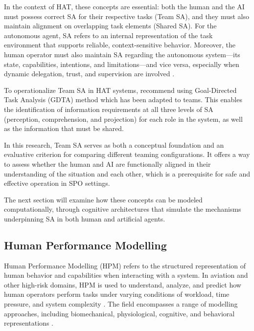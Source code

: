 \documentclass[12pt,a4paper]{article} %
\begin{document}
	In the context of HAT, these concepts are essential: both the human and the AI must possess correct SA for their respective tasks (Team SA), and they must also maintain alignment on overlapping task elements (Shared SA). For the autonomous agent, SA refers to an internal representation of the task environment that supports reliable, context-sensitive behavior. Moreover, the human operator must also maintain SA regarding the autonomous system—its state, capabilities, intentions, and limitations—and vice versa, especially when dynamic delegation, trust, and supervision are involved \parencite{endsley_designing_2003,national_academies_of_sciences_engineering_and_medicine_human-ai_2022}.

	To operationalize Team SA in HAT systems, \textcite{endsley_supporting_2023} recommend using Goal-Directed Task Analysis (GDTA) method which has been adapted to teams. This enables the identification of information requirements at all three levels of SA (perception, comprehension, and projection) for each role in the system, as well as the information that must be shared.

	In this research, Team SA serves as both a conceptual foundation and an evaluative criterion for comparing different teaming configurations. It offers a way to assess whether the human and AI are functionally aligned in their understanding of the situation and each other, which is a prerequisite for safe and effective operation in SPO settings.

	The next section will examine how these concepts can be modeled computationally, through cognitive architectures that simulate the mechanisms underpinning SA in both human and artificial agents.

	\subsection{Human Performance Modelling}

	Human Performance Modelling (HPM) refers to the structured representation of human behavior and capabilities when interacting with a system. In aviation and other high-risk domains, HPM is used to understand, analyze, and predict how human operators perform tasks under varying conditions of workload, time pressure, and system complexity \parencite{paul_modelling_2021}. The field encompasses a range of modelling approaches, including biomechanical, physiological, cognitive, and behavioral representations \parencite{alexander_ergonomic_2014,chander_modelling_2019,park_review_2024}.
\end{document}
